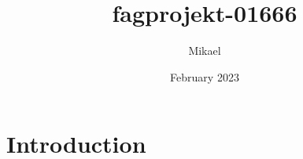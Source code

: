 \documentclass{article}
\title{fagprojekt-01666}
\author{Mikael }
\date{February 2023}
\begin{document}
\maketitle

\section{Introduction}
\end{document}
